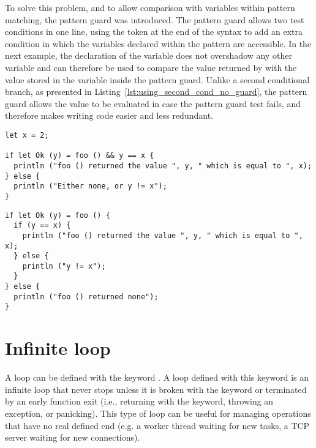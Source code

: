 To solve this problem, and to allow comparison with variables within pattern
matching, the pattern guard was introduced. The pattern guard allows two test
conditions in one line, using the token \token{\&\&} at the end of the syntax
 to add an extra condition in which the
variables declared within the pattern are accessible. In the next example, the
declaration of the variable  does not overshadow any other variable and
can therefore be used to compare the value returned by  with the
value stored in the variable  inside the pattern guard. Unlike a second
conditional branch, as presented in
Listing~\ref{lst:using_second_cond_no_guard}, the pattern guard allows the
 value to be evaluated in case the pattern guard test fails, and
therefore makes writing code easier and less redundant.



\begin{lstlisting}[style=coloredverbatim, caption=Using a pattern guard]
let x = 2;

if let Ok (y) = foo () && y == x {
  println ("foo () returned the value ", y, " which is equal to ", x);
} else {
  println ("Either none, or y != x");
}
\end{lstlisting}

\begin{lstlisting}[style=coloredverbatim, caption=Using a second condition instead of pattern guard, label=lst:using_second_cond_no_guard]
if let Ok (y) = foo () {
  if (y == x) {
    println ("foo () returned the value ", y, " which is equal to ", x);
  } else {
    println ("y != x");
  }
} else {
  println ("foo () returned none");
}
\end{lstlisting}

\vfill%
\pagebreak

\section{Infinite loop}%
\label{sec:inf_loop}

A loop can be defined with the keyword . A loop defined with this
keyword is an infinite loop that never stops unless it is broken with the
 keyword or terminated by an early function exit (i.e., returning
with the  keyword, throwing an exception, or panicking). This type
of loop can be useful for managing operations that have no real defined end
(e.g. a worker thread waiting for new tasks, a TCP server waiting for new
connections).

